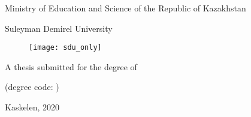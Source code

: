 \begin{titlepage}
\begin{center}
\large
Ministry of Education and Science of the Republic of Kazakhstan

Suleyman Demirel University

\vspace{1cm}
\begin{figure}[h]
    \centering
    \texttt{[image: sdu\_only]}
\end{figure}

\vspace{2cm}
\Large
\myauthor

\vspace{1cm}
\Large
\textbf{\mytitle}

\vspace{1cm}
\large
A thesis submitted for the degree of

\mydegree

(degree code: \mydegreecode)

\vfill
Kaskelen, 2020

\end{center}
\end{titlepage}